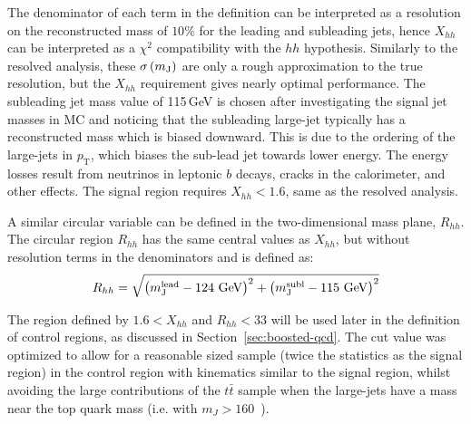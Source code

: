 The denominator of each term in the definition can be interpreted as a resolution on the reconstructed mass of $10\%$ for the leading and subleading jets, hence $X_{hh}$ can be interpreted as a $\chi^2$ compatibility with the $hh$ hypothesis. Similarly to the resolved analysis, these $\sigma \left(m_{\rm J}\right)$ are only a rough approximation to the true resolution, but the $X_{hh}$ requirement gives nearly optimal performance. The subleading jet mass value of 115\,GeV  is chosen after investigating the signal jet masses in MC and noticing that the subleading large-\R jet typically has a reconstructed mass which is biased downward. This is due to the ordering of the large-\R jets in $p_\text{T}$, which biases the sub-lead jet towards lower energy. The energy losses result from neutrinos in leptonic $b$ decays, cracks in the calorimeter, and other effects. The signal region requires $X_{hh} < 1.6$, same as the resolved analysis. 


A similar circular variable can be defined in the two-dimensional mass plane, $R_{hh}$. The circular region $R_{hh}$ has the same central values as $X_{hh}$, but without resolution terms in the denominators and is defined as:
\begin{equation}
\label{eq:boosted_RhhDef}
R_{hh} = \sqrt{\left(m^{\rm lead}_{\rm J} - \text{124 GeV}\right)^2 + \left(m^{\rm subl}_{\rm J} - \text{115 GeV}\right)^2}
\end{equation}

The region defined by $1.6 < X_{hh}$ and $R_{hh} < 33$ will be used later in the definition of control regions, as discussed in Section~\ref{sec:boosted-qcd}. The cut value was optimized to allow for a reasonable sized sample (twice the statistics as the signal region) in the control region with kinematics similar to the signal region, whilst avoiding the large contributions of the $t\bar{t}$ sample when the large-\R jets have a mass near the top quark mass (i.e. with $m_J > 160$~\GeV).


